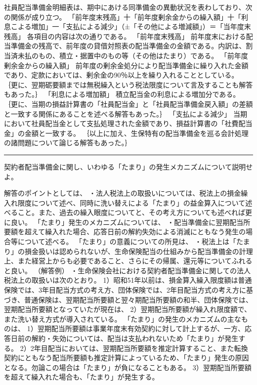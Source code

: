 \documentclass[report,gutter=10mm,fore-edge=10mm,uplatex,dvipdfmx]{jlreq}
\begin{document}

社員配当準備金明細表は、期中にあける同準備金の異動状況を表わしており、次の関係が成り立つ。
「前年度末残高」十「前年度剰余金からの繰入額」十「利息こよる増加」一「支払による減少」（±「その他による増減額」）＝「当年度末残高」
各項目の内容は次の通りである。
「前年度末残高」 前年度末における配当準備金の残高で、前年度の貸借対照表の配当準備金の金額である。内訳は、割当済未払のもの、積立・据置中のもの等（その他はたまり）である。
「前年度剰余金からの繰入額」 前年度の剰余金処分により配当準備金に繰り入れた金額であり、定款においては、剰余金の90％以上を繰り入れることとしている。
｛更に、翌期砺要額までは無税繰入という税法限度について言及することも解答もあった。｝
「利息による増加額」 積立配当金の利息による増加分である。
｛更に、当期の損益計算書の「社員配当金」と「社員配当準備金戻入額」の差額と一致する関係にあることを述べる解答もあった。｝
「支払による減少」 当期において社員配当金として支払処理された金額であり、損益計算書の「社費配当金」の金額と一致する。
｛以上に加え、生保特有の配当準備金を巡る会計処理の諸問題について論じる解答もあった。｝

\begin{center}\rule{0.5\linewidth}{0.5pt}\end{center}


契約者配当準備金に関し、いわゆる「たまり」の発生メカニズムについて説明せよ。


解答のポイントとしては、
・法人税法上の取扱いについては、税法上の損金繰入れ限度について述べ、同時に洗い替えによる「たまり」の益金算入について述べること。また、過去の繰入眼度についてと、その考え方についても述べれば更に良い。
「たまり」発生のメカニズムについては、
・配当準備金に翌期配当所要額を超えて繰入れた場合、応答日前の解約失効による消滅にともなう発生の場合等について述べる。
「たまり」の意義についての所見は、
・税法上は「たまり」の損金扱いは認められないが、生命保険配当の仕組みから配当準備金の計理上、また経営上からも必要であること、さらにその帰属、還元等についてふれると良い。
（解答例）
・生命保険会社における契約者配当準備金に関しての法人税法上の取扱いは次のとおり。
1）昭和51年以前は、損金算入繰入限度額は普通保険では、3年目配当方式の考え方、団体保険では、2年目配当方式の考え方に基づき、普通保険は、翌期配当所要額と翌々期配当所要額の和半、団体保険では、翌期配当所要額となっていたが現在は、
2）翌期配当所要額が繰入れ限度額で、また洗い替え方式が導入されている。
「たまり」の発生のメカニズムの主なものは、
1）翌期配当所要額は事業年度末有効契約に対して計上するが、一方、応答日前の解約・失効については、配当は支払われないため「たまり」が発生する。
2）2年目配当においては、翌期配当所要額を推定計算すること、また転換契約にともなう配当所要額も推定計算によっているため、「たまり」発生の原因となる。勿論この場合は「たまり」が負になることもある。
3）翌期配当所要額を超えて繰入れた場合も、「たまり」が発生する。
\end{document}
